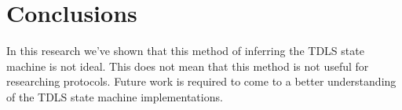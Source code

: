 \chapter{Conclusions}\label{conclusions}
\iffalse
In this chapter you present all conclusions that can be drawn from the
preceding chapters.
It should not introduce new experiments, theories, investigations, etc.:
these should have been written down earlier in the thesis.
Therefore, conclusions can be brief and to the point.
\fi

In this research we've shown that this method of inferring the TDLS state machine is not ideal. This does not mean that this method is not useful for researching protocols.
Future work is required to come to a better understanding of the TDLS state machine implementations.